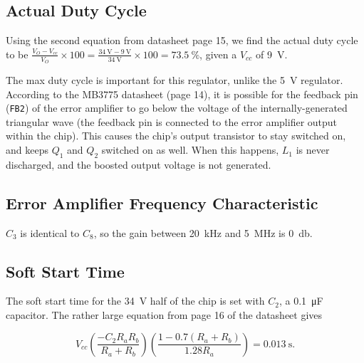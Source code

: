 \documentclass{article}
\newcommand{\Vcc}{$V_{cc}$}
\newcommand{\chippin}{\texttt}
\newcommand{\model}{\textsf}
\begin{document}
\subsection{Actual Duty Cycle}
\label{sec:34v_actual_duty_cycle}
Using the second equation from datasheet page 15, we find the actual
duty cycle to be
$\frac{V_O - V_{cc}}{V_O} \times{} 100 = \frac{\qty{34}{\volt} -
  \qty{9}{\volt}}{\qty{34}{\volt}} \times{} 100 = \qty{73.5}{\%}$,
given a \Vcc{} of \qty{9}{\volt}.



The max duty cycle is important for this regulator, unlike the
\qty{5}{\volt} regulator. According to the \model{MB3775} datasheet
(page 14), it is possible for the feedback pin (\chippin{FB2}) of the
error amplifier to go below the voltage of the internally-generated
triangular wave (the feedback pin is connected to the error amplifier
output within the chip). This causes the chip's output transistor to
stay switched on, and keeps $Q_1$ and $Q_2$ switched on as well. When
this happens, $L_1$ is never discharged, and the boosted output
voltage is not generated.

\subsection{Error Amplifier Frequency Characteristic}
$C_3$ is identical to $C_8$, so the gain between \qty{20}{\kilo\hertz}
and \qty{5}{\mega\hertz} is \qty{0}{\decibel}.

\subsection{Soft Start Time}
\label{sec:soft_start_time}
The soft start time for the \qty{34}{\volt} half of the chip is set
with $C_2$, a \qty{0.1}{\micro\farad} capacitor. The rather large
equation from page 16 of the datasheet gives

\begin{displaymath}
  V_{cc}\left(\frac{-C_2R_aR_b}{R_a+R_b}\right)\left(\frac{1-0.7(R_a+R_b)}{1.28R_a}\right)
  = \qty{0.013}{\second}.
\end{displaymath}
\end{document}
